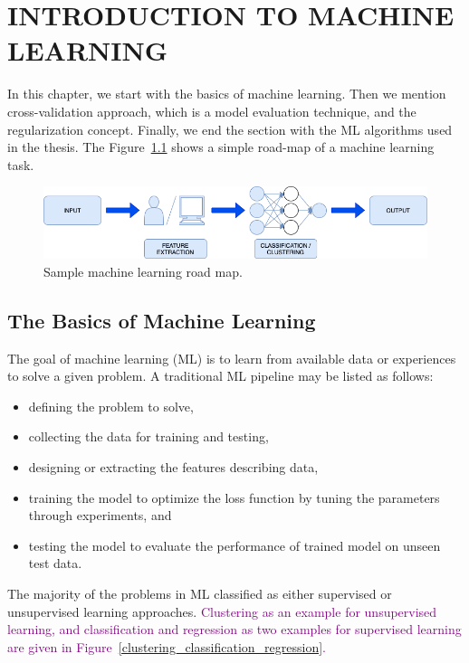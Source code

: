 \chapter{INTRODUCTION TO MACHINE LEARNING}
\label{ch:CH4}

In this chapter, we start with the basics of machine learning. Then we mention cross-validation approach, which is a model evaluation technique, and the regularization concept. Finally, we end the section with the ML algorithms used in the thesis. The Figure~\ref{basic_ml} shows a simple road-map of a machine learning task.

\begin{figure}[h]
	\centering
	\includegraphics[width=\linewidth]{fig/basic_ml.png}
	\vspace*{2mm}
	\caption{Sample machine learning road map.}
	\label{basic_ml}
\end{figure}

\section{The Basics of Machine Learning}

The goal of machine learning (ML) is to learn from available data or experiences to solve a given problem. A traditional ML pipeline may be listed as follows:

\begin{itemize}
    \item defining the problem to solve,
    \item collecting the data for training and testing,
    \item designing or extracting the features describing data,
    \item training the model to optimize the loss function by tuning the parameters through experiments, and
    \item testing the model to evaluate the performance of trained model on unseen test data.
\end{itemize}

The majority of the problems in ML classified as either supervised or unsupervised learning approaches. \textcolor{purple}{Clustering as an example for unsupervised learning, and classification and regression as two examples for supervised learning are given in Figure~\ref{clustering_classification_regression}.}

